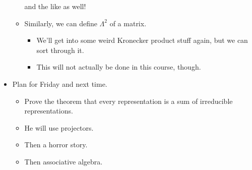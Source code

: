 \documentclass[../notes.tex]{subfiles}
\begin{document}
\begin{itemize}
\begin{itemize}
\begin{equation*}
        \end{equation*}
        and the like as well!
        \item Similarly, we can define $\Lambda^2$ of a matrix.
        \begin{itemize}
            \item We'll get into some weird Kronecker product stuff again, but we can sort through it.
            \item This will not actually be done in this course, though.
        \end{itemize}
    \end{itemize}
    \item Plan for Friday and next time.
    \begin{itemize}
        \item Prove the theorem that every representation is a sum of irreducible representations.
        \item He will use projectors.
        \item Then a horror story.
        \item Then associative algebra.
    \end{itemize}
\end{itemize}
\end{document}
